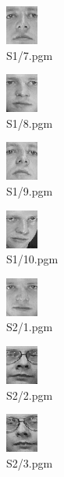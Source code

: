 \documentclass[dvipsnames]{article}
\begin{document}
\begin{multicols}{3}
\begin{figure}[H]
	\centering\includegraphics{Out-JPG/S1/7.jpg}
	\caption{S1/7.pgm}
\end{figure}

\begin{figure}[H]
	\centering\includegraphics{Out-JPG/S1/8.jpg}
	\caption{S1/8.pgm}
\end{figure}

\begin{figure}[H]
	\centering\includegraphics{Out-JPG/S1/9.jpg}
	\caption{S1/9.pgm}
\end{figure}

\begin{figure}[H]
	\centering\includegraphics{Out-JPG/S1/10.jpg}
	\caption{S1/10.pgm}
\end{figure}

\begin{figure}[H]
	\centering\includegraphics{Out-JPG/S1/1.jpg}
	\caption{S2/1.pgm}
\end{figure}
\begin{figure}[H]
	\centering\includegraphics{Out-JPG/S2/2.jpg}
	\caption{S2/2.pgm}
\end{figure}

\begin{figure}[H]
	\centering\includegraphics{Out-JPG/S2/3.jpg}
	\caption{S2/3.pgm}
\end{figure}


\end{multicols}
\end{document}
